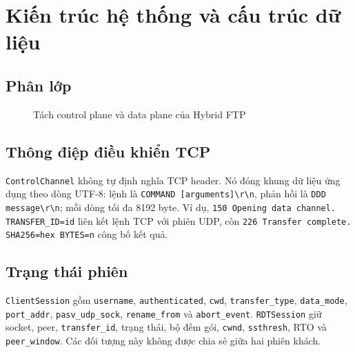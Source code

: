 \section{Kiến trúc hệ thống và cấu trúc dữ liệu}

\subsection{Phân lớp}
\begin{figure}[H]\centering
{}
\caption{Tách control plane và data plane của Hybrid FTP}\label{fig:architecture}
\end{figure}

\subsection{Thông điệp điều khiển TCP}
\texttt{ControlChannel} không tự định nghĩa TCP header. 
Nó đóng khung dữ liệu ứng dụng theo dòng UTF-8: lệnh là \texttt{COMMAND [arguments]\textbackslash r\textbackslash n}, phản hồi là \texttt{DDD message\textbackslash r\textbackslash n}; mỗi dòng tối đa 8192 byte. 
Ví dụ, \texttt{150 Opening data channel. 
TRANSFER\_ID=id} liên kết lệnh TCP với phiên UDP, còn \texttt{226 Transfer complete. SHA256=hex BYTES=n} công bố kết quả.

\subsection{Trạng thái phiên}
\texttt{ClientSession} gồm \texttt{username}, \texttt{authenticated}, \texttt{cwd}, \texttt{transfer\_type}, \texttt{data\_mode}, \texttt{port\_addr}, \texttt{pasv\_udp\_sock}, \texttt{rename\_from} và \texttt{abort\_event}. 
\texttt{RDTSession} giữ socket, peer, \texttt{transfer\_id}, trạng thái, bộ đếm gói, \texttt{cwnd}, \texttt{ssthresh}, RTO và \texttt{peer\_window}. 
Các đối tượng này không được chia sẻ giữa hai phiên khách.

